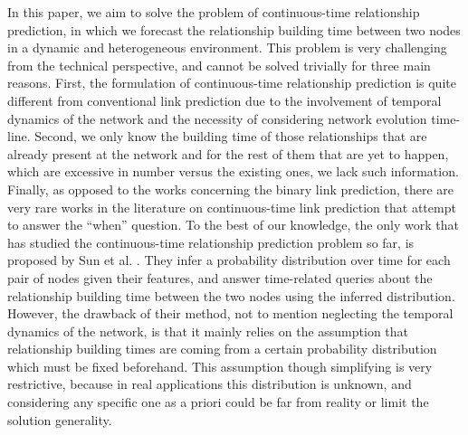 In this paper, we aim to solve the problem of continuous-time relationship prediction, in which we forecast the relationship building time between two nodes in a dynamic and heterogeneous environment. This problem is very challenging from the technical perspective, and cannot be solved trivially for three main reasons. First, the formulation of continuous-time relationship prediction is quite different from conventional link prediction due to the involvement of temporal dynamics of the network and the necessity of considering network evolution time-line. Second, we only know the building time of those relationships that are already present at the network and for the rest of them that are yet to happen, which are excessive in number versus the existing ones, we lack such information. Finally, as opposed to the works concerning the binary link prediction, there are very rare works in the literature on continuous-time link prediction that attempt to answer the ``when'' question. To the best of our knowledge, the only work that has studied the continuous-time relationship prediction problem so far, is proposed by Sun et al. \cite{sun2012will}. They infer a probability distribution over time for each pair of nodes given their features, and answer time-related queries about the relationship building time between the two nodes using the inferred distribution. However, the drawback of their method, not to mention neglecting the temporal dynamics of the network, is that it mainly relies on the assumption that relationship building times are coming from a certain probability distribution which must be fixed beforehand. This assumption though simplifying is very restrictive, because in real applications this distribution is unknown, and considering any specific one as a priori could be far from reality or limit the solution generality.


